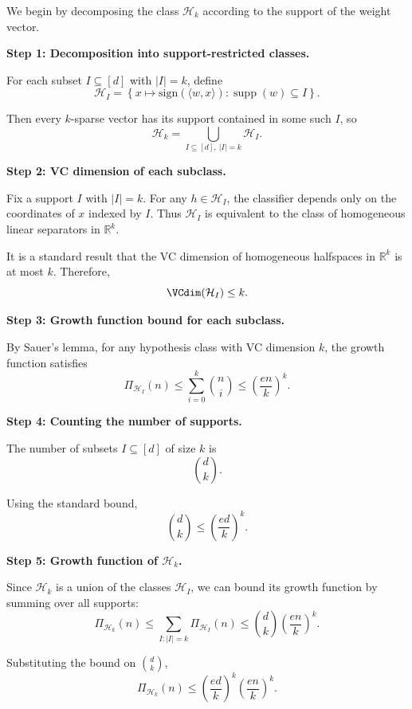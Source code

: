 \documentclass[11pt]{article}
\newcommand{\R}{\mathbb{R}}
\newcommand{\calH}{\mathcal{H}}
\newcommand{\sign}{\mathrm{sign}}
\begin{document}
\begin{solutionbox}

We begin by decomposing the class $\calH_k$ according to the support of the weight vector.

\medskip

\textbf{Step 1: Decomposition into support-restricted classes.}

For each subset $I \subseteq [d]$ with $|I| = k$, define
\[
\calH_I
=
\left\{
x \mapsto \sign(\langle w, x \rangle)
:
\operatorname{supp}(w) \subseteq I
\right\}.
\]

Then every $k$-sparse vector has its support contained in some such $I$, so
\[
\calH_k
=
\bigcup_{I \subseteq [d],\ |I|=k} \calH_I.
\]

\medskip

\textbf{Step 2: VC dimension of each subclass.}

Fix a support $I$ with $|I| = k$. For any $h \in \calH_I$, the classifier depends only on the coordinates of $x$ indexed by $I$. Thus $\calH_I$ is equivalent to the class of homogeneous linear separators in $\R^k$.

It is a standard result that the VC dimension of homogeneous halfspaces in $\R^k$ is at most $k$. Therefore,
\[
\VCdim(\calH_I) \le k.
\]

\medskip

\textbf{Step 3: Growth function bound for each subclass.}

By Sauer’s lemma, for any hypothesis class with VC dimension $k$, the growth function satisfies
\[
\Pi_{\calH_I}(n)
\le
\sum_{i=0}^k \binom{n}{i}
\le
\left(\frac{en}{k}\right)^k.
\]

\medskip

\textbf{Step 4: Counting the number of supports.}

The number of subsets $I \subseteq [d]$ of size $k$ is
\[
\binom{d}{k}.
\]

Using the standard bound,
\[
\binom{d}{k}
\le
\left(\frac{ed}{k}\right)^k.
\]

\medskip

\textbf{Step 5: Growth function of $\calH_k$.}

Since $\calH_k$ is a union of the classes $\calH_I$, we can bound its growth function by summing over all supports:
\[
\Pi_{\calH_k}(n)
\le
\sum_{I:|I|=k} \Pi_{\calH_I}(n)
\le
\binom{d}{k}
\left(\frac{en}{k}\right)^k.
\]

Substituting the bound on $\binom{d}{k}$,
\[
\Pi_{\calH_k}(n)
\le
\left(\frac{ed}{k}\right)^k
\left(\frac{en}{k}\right)^k.
\]


\end{solutionbox}
\end{document}
